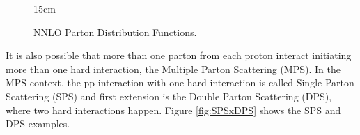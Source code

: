 \begin{figure}[!htm]{15cm} %
\caption{NNLO Parton Distribution Functions.}%
\label{fig:NNLOPDFs}
\end{figure}

It is also possible that more than one parton from each proton interact initiating more than one hard interaction, the Multiple Parton Scattering (MPS). In the MPS context, the pp interaction with one hard interaction is called Single Parton Scattering (SPS) and first extension is the Double Parton Scattering (DPS), where two hard interactions happen. Figure \ref{fig:SPSxDPS} shows the SPS and DPS examples.

